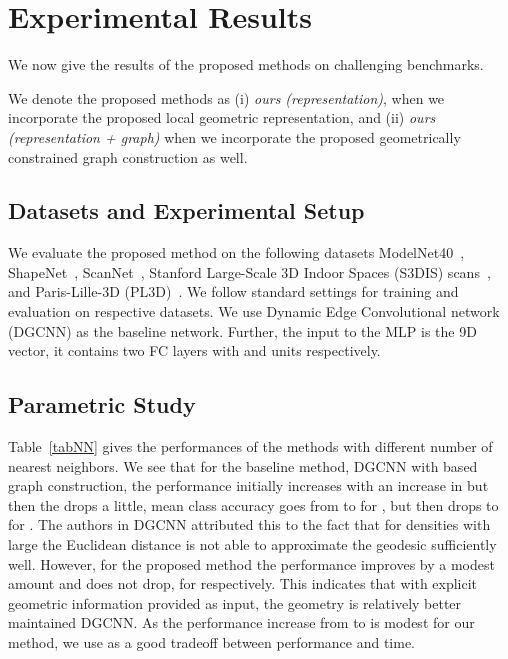 \vspace{-0.8ex}
\section{Experimental Results}
\label{secExp}

We now give the results of the proposed methods on challenging benchmarks.

We denote the proposed methods as (i) \emph{ours (representation)}, when we incorporate the
proposed local geometric representation, and (ii) \emph{ours (representation + graph)} when we
incorporate the proposed geometrically constrained graph construction as well. 

\vspace{-0.6ex}
\subsection{Datasets and Experimental Setup}
We evaluate the proposed method on the following datasets ModelNet40~\cite{wu20153d}, ShapeNet~\cite{yi2016scalable}, ScanNet~\cite{dai2017scannet}, Stanford Large-Scale 3D Indoor Spaces (S3DIS) scans~\cite{armeni20163d}, and Paris-Lille-3D (PL3D)~\cite{roynard2018paris}. We follow standard settings for training and evaluation on respective datasets. We use Dynamic Edge Convolutional network (DGCNN) \cite{wang2019dynamic} as the baseline network. Further, the input to the MLP is the 9D vector, it contains two FC layers with  and  units respectively.

\vspace{-0.6ex}
\subsection{Parametric Study}
Table~\ref{tabNN} gives the performances of the methods with different number of nearest neighbors.
We see that for the baseline method, DGCNN with \knn based graph construction, the performance
initially increases with an increase in  but then the drops a little, \eg mean class accuracy
goes from  to  for , but then drops to  for . The authors in DGCNN
\cite{wang2019dynamic} attributed this to the fact that for densities with large  the Euclidean
distance is not able to approximate the geodesic sufficiently well. However, for the proposed method
the performance improves by a modest amount and does not drop, \ie  for
 respectively. This indicates that with explicit geometric information provided as input,
the geometry is relatively better maintained \cf DGCNN. As the performance increase from  to
 is modest for our method, we use  as a good tradeoff between performance and time.

